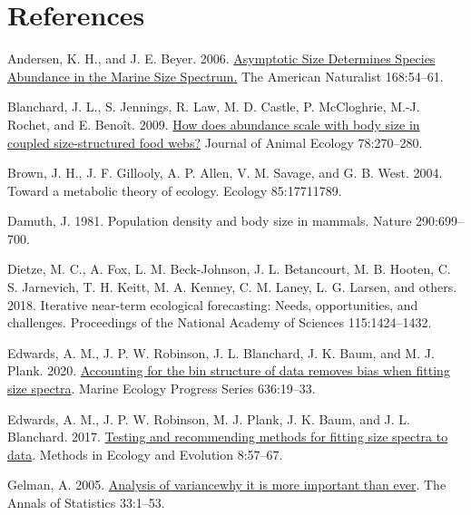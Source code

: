 \documentclass[
  12pt,
]{article}
\newlength{\cslhangindent}
\newlength{\cslentryspacingunit} %
\newenvironment{CSLReferences}[2] %
 {%
  \setlength{\parindent}{0pt}
  \ifodd #1
  \let\oldpar\par
  \def\par{\hangindent=\cslhangindent\oldpar}
  \fi
  \setlength{\parskip}{#2\cslentryspacingunit}
 }%
 {}
\begin{document}
\hypertarget{references}{%
\section{References}\label{references}}

\hypertarget{refs}{}
\begin{CSLReferences}{1}{0}
\leavevmode{}%
Andersen, K. H., and J. E. Beyer. 2006.
\href{https://doi.org/10.1086/504849}{Asymptotic {Size Determines
Species Abundance} in the {Marine Size Spectrum}.} The American
Naturalist 168:54--61.

\leavevmode{}%
Blanchard, J. L., S. Jennings, R. Law, M. D. Castle, P. McCloghrie,
M.-J. Rochet, and E. Benoît. 2009.
\href{https://doi.org/10.1111/j.1365-2656.2008.01466.x}{How does
abundance scale with body size in coupled size-structured food webs?}
Journal of Animal Ecology 78:270--280.

\leavevmode{}%
Brown, J. H., J. F. Gillooly, A. P. Allen, V. M. Savage, and G. B. West.
2004. Toward a metabolic theory of ecology. Ecology 85:17711789.

\leavevmode{}%
Damuth, J. 1981. Population density and body size in mammals. Nature
290:699--700.

\leavevmode{}%
Dietze, M. C., A. Fox, L. M. Beck-Johnson, J. L. Betancourt, M. B.
Hooten, C. S. Jarnevich, T. H. Keitt, M. A. Kenney, C. M. Laney, L. G.
Larsen, and others. 2018. Iterative near-term ecological forecasting:
Needs, opportunities, and challenges. Proceedings of the National
Academy of Sciences 115:1424--1432.

\leavevmode{}%
Edwards, A. M., J. P. W. Robinson, J. L. Blanchard, J. K. Baum, and M.
J. Plank. 2020. \href{https://doi.org/10.3354/meps13230}{Accounting for
the bin structure of data removes bias when fitting size spectra}.
Marine Ecology Progress Series 636:19--33.

\leavevmode{}%
Edwards, A. M., J. P. W. Robinson, M. J. Plank, J. K. Baum, and J. L.
Blanchard. 2017. \href{https://doi.org/10.1111/2041-210X.12641}{Testing
and recommending methods for fitting size spectra to data}. Methods in
Ecology and Evolution 8:57--67.

\leavevmode{}%
Gelman, A. 2005.
\href{https://doi.org/10.1214/009053604000001048}{Analysis of
variance\textemdash why it is more important than ever}. The Annals of
Statistics 33:1--53.


\end{CSLReferences}
\end{document}
